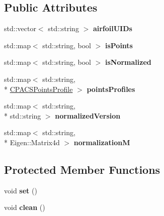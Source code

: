 \subsection*{Public Attributes}
\begin{DoxyCompactItemize}
\item 
\hypertarget{classcpcr_1_1CPACSProfilesDB_ab205a202be2be2e1682a85e4e4563c81}{std\-::vector$<$ std\-::string $>$ {\bfseries airfoil\-U\-I\-Ds}}\label{classcpcr_1_1CPACSProfilesDB_ab205a202be2be2e1682a85e4e4563c81}

\item 
\hypertarget{classcpcr_1_1CPACSProfilesDB_af6d68c2db538b44c549d0fd2fa0e9187}{std\-::map$<$ std\-::string, bool $>$ {\bfseries is\-Points}}\label{classcpcr_1_1CPACSProfilesDB_af6d68c2db538b44c549d0fd2fa0e9187}

\item 
\hypertarget{classcpcr_1_1CPACSProfilesDB_a42d063d4af2f9ffd5861c063905befd9}{std\-::map$<$ std\-::string, bool $>$ {\bfseries is\-Normalized}}\label{classcpcr_1_1CPACSProfilesDB_a42d063d4af2f9ffd5861c063905befd9}

\item 
\hypertarget{classcpcr_1_1CPACSProfilesDB_aefc14ed53f42479b6f072f568241db23}{std\-::map$<$ std\-::string, \\*
\hyperlink{classcpcr_1_1CPACSPointsProfile}{C\-P\-A\-C\-S\-Points\-Profile} $>$ {\bfseries points\-Profiles}}\label{classcpcr_1_1CPACSProfilesDB_aefc14ed53f42479b6f072f568241db23}

\item 
\hypertarget{classcpcr_1_1CPACSProfilesDB_a949889a80ad1217ccd24df9dcb0c8b35}{std\-::map$<$ std\-::string, \\*
std\-::string $>$ {\bfseries normalized\-Version}}\label{classcpcr_1_1CPACSProfilesDB_a949889a80ad1217ccd24df9dcb0c8b35}

\item 
\hypertarget{classcpcr_1_1CPACSProfilesDB_a16360cbead1fe7016f25a26d376d8341}{std\-::map$<$ std\-::string, \\*
Eigen\-::\-Matrix4d $>$ {\bfseries normalization\-M}}\label{classcpcr_1_1CPACSProfilesDB_a16360cbead1fe7016f25a26d376d8341}

\end{DoxyCompactItemize}
\subsection*{Protected Member Functions}
\begin{DoxyCompactItemize}
\item 
\hypertarget{classcpcr_1_1CPACSProfilesDB_a6a23bc94042ae8f9e11aab07434451d1}{void {\bfseries set} ()}\label{classcpcr_1_1CPACSProfilesDB_a6a23bc94042ae8f9e11aab07434451d1}

\item 
\hypertarget{classcpcr_1_1CPACSProfilesDB_a1b18c1012d913269face4a62e2e78b44}{void {\bfseries clean} ()}\label{classcpcr_1_1CPACSProfilesDB_a1b18c1012d913269face4a62e2e78b44}

\end{DoxyCompactItemize}


